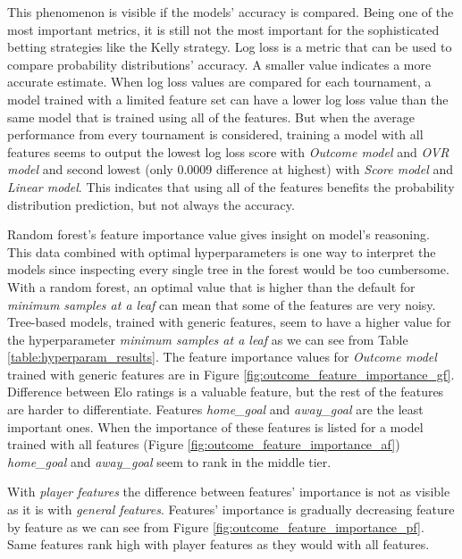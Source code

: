 This phenomenon is visible if the models' accuracy is compared. Being one of the most important metrics, it is still not the most important for the sophisticated betting strategies like the Kelly strategy. Log loss is a metric that can be used to compare probability distributions' accuracy. A smaller value indicates a more accurate estimate. When log loss values are compared for each tournament, a model trained with a limited feature set can have a lower log loss value than the same model that is trained using all of the features. But when the average performance from every tournament is considered, training a model with all features seems to output the lowest log loss score with \textit{Outcome model} and \textit{OVR model} and second lowest (only 0.0009 difference at highest) with \textit{Score model} and \textit{Linear model}. This indicates that using all of the features benefits the probability distribution prediction, but not always the accuracy.

Random forest's feature importance value gives insight on model's reasoning. This data combined with optimal hyperparameters is one way to interpret the models since inspecting every single tree in the forest would be too cumbersome. With a random forest, an optimal value that is higher than the default for \textit{minimum samples at a leaf} can mean that some of the features are very noisy. Tree-based models, trained with generic features, seem to have a higher value for the hyperparameter \textit{minimum samples at a leaf} as we can see from Table \ref{table:hyperparam_results}. The feature importance values for \textit{Outcome model} trained with generic features are in Figure \ref{fig:outcome_feature_importance_gf}. Difference between Elo ratings is a valuable feature, but the rest of the features are harder to differentiate. Features \textit{home\_goal} and \textit{away\_goal} are the least important ones. When the importance of these features is listed for a model trained with all features (Figure \ref{fig:outcome_feature_importance_af}) \textit{home\_goal} and \textit{away\_goal} seem to rank in the middle tier.

With \textit{player features} the difference between features' importance is not as visible as it is with \textit{general features}. Features' importance is gradually decreasing feature by feature as we can see from Figure \ref{fig:outcome_feature_importance_pf}. Same features rank high with player features as they would with all features.

